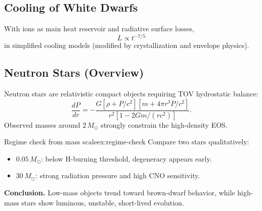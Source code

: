 \subsection{Cooling of White Dwarfs}
\begin{theory}
With ions as main heat reservoir and radiative surface losses,
\begin{equation}
    L\propto t^{-7/5}
\end{equation}
in simplified cooling models (modified by crystallization and envelope physics).
\end{theory}

\subsection{Neutron Stars (Overview)}
\begin{extra}
Neutron stars are relativistic compact objects requiring TOV hydrostatic balance:
\begin{equation}
    \frac{dP}{dr}=-\frac{G[\rho+P/c^2][m+4\pi r^3P/c^2]}{r^2\left[1-2Gm/(rc^2)\right]}.
\end{equation}
Observed masses around $2\,M_\odot$ strongly constrain the high-density EOS.
\end{extra}

\begin{example}{Regime check from mass scale}{ex:regime-check}
Compare two stars qualitatively:
\begin{itemize}
    \item $0.05\,M_\odot$: below H-burning threshold, degeneracy appears early.
    \item $30\,M_\odot$: strong radiation pressure and high CNO sensitivity.
\end{itemize}

\smallskip\textbf{Conclusion.}
Low-mass objects trend toward brown-dwarf behavior, while high-mass stars show luminous, unstable, short-lived evolution.
\end{example}

